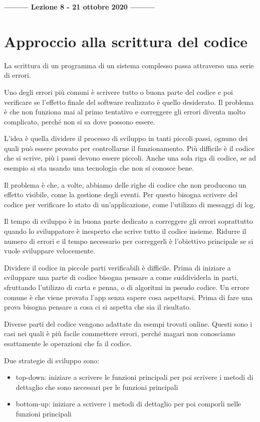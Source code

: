 \begin{center}
    \textbf{--------- Lezione 8 - 21 ottobre 2020 ---------}
\end{center}

\section{Approccio alla scrittura del codice}
La scrittura di un programma di un sistema complesso passa attraverso una serie di errori. 

Uno degli errori più comuni è scrivere tutto o buona parte del codice e poi verificare se l'effetto finale del software realizzato è quello desiderato. 
Il problema è che non funziona mai al primo tentativo e correggere gli errori diventa molto complicato, perché non si sa dove possono essere.

L'idea è quella dividere il processo di sviluppo in tanti piccoli passi, ognuno dei quali può essere provato per controllarne il funzionamento. 
Più difficile è il codice che si scrive, più i passi devono essere piccoli. Anche una sola riga di codice, se ad esempio si sta usando una tecnologia che non si conosce bene. 

Il problema è che, a volte, abbiamo delle righe di codice che non producono un effetto visibile, come la gestione degli eventi. 
Per questo bisogna scrivere del codice per verificare lo stato di un'applicazione, come l'utilizzo di messaggi di log.

Il tempo di sviluppo è in buona parte dedicato a correggere gli errori soprattutto quando lo sviluppatore è inesperto che scrive tutto il codice insieme. 
Ridurre il numero di errori e il tempo necessario per correggerli è 
l’obiettivo principale se si vuole sviluppare velocemente.

Dividere il codice in piccole parti verificabili è difficile. 
Prima di iniziare a sviluppare una parte di codice bisogna pensare a come suddividerla in parti, sfruttando l'utilizzo di carta e penna, o di algoritmi in pseudo codice. 
Un errore comune è che viene provata l'app senza sapere cosa aspettarsi. Prima di fare una prova bisogna pensare a cosa ci si aspetta che sia il risultato.

Diverse parti del codice vengono adattate da esempi trovati online. Questi sono i casi nei quali è più facile commettere errori, perché magari non conosciamo esattamente le operazioni che fa il codice. 

Due strategie di sviluppo sono:
\begin{itemize}
    \item top-down: iniziare a scrivere le funzioni principali per poi scrivere i metodi di dettaglio che sono necessari per le funzioni principali
    \item bottom-up: iniziare a scrivere i metodi di dettaglio per poi comporli nelle funzioni principali
\end{itemize}

